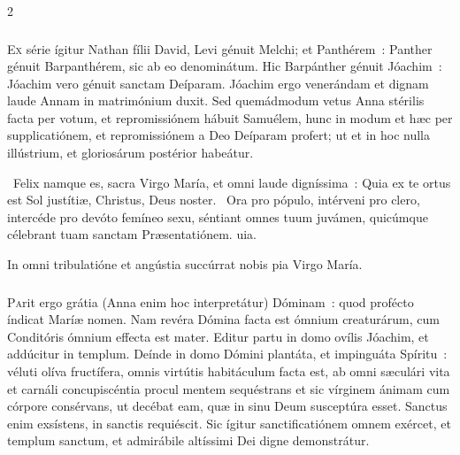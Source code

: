 \documentclass[9pt,twoside]{extarticle}
\begin{document}
\begin{multicols}{2}
\subsubsection*{\center{}}
\lettrine{E}x série ígitur Nathan fílii David, Levi génuit Melchi; et Panthérem~: Panther génuit Barpanthérem, sic ab eo denominátum. Hic Barpánther génuit Jóachim~: Jóachim vero génuit sanctam Deíparam. Jóachim ergo venerándam et dignam laude Annam in matrimónium duxit. Sed quemádmodum vetus Anna stérilis facta per votum, et repromissiónem hábuit Samuélem, hunc in modum et hæc per supplicatiónem, et repromissiónem a Deo Deíparam profert; ut et in hoc nulla illústrium, et gloriosárum postérior habeátur.

\begin{tightlist}{}
\item {}~Felix namque es, sacra Virgo María, et omni laude digníssima~: \textred{*} Quia ex te ortus est Sol justítiæ, Christus, Deus noster. ~Ora pro pópulo, intérveni pro clero, intercéde pro devóto femíneo sexu, séntiant omnes tuum juvámen, quicúmque célebrant tuam sanctam Præsentatiónem. uia.
\item {\small {} In omni tribulatióne et angústia succúrrat nobis pia Virgo María.}
\end{tightlist}

\subsubsection*{\center{}}
\lettrine{P}arit ergo grátia (Anna enim hoc interpretátur) Dóminam~: quod profécto índicat Maríæ nomen. Nam revéra Dómina facta est ómnium creaturárum, cum Conditóris ómnium effecta est mater. Editur partu in domo ovílis Jóachim, et addúcitur in templum. Deínde in domo Dómini plantáta, et impinguáta Spíritu~: véluti olíva fructífera, omnis virtútis habitáculum facta est, ab omni sæculári vita et carnáli concupiscéntia procul mentem sequéstrans et sic vírginem ánimam cum córpore consérvans, ut decébat eam, quæ in sinu Deum susceptúra esset. Sanctus enim exsístens, in sanctis requiéscit. Sic ígitur sanctificatiónem omnem exércet, et templum sanctum, et admirábile altíssimi Dei digne demonstrátur.


\end{multicols}
\end{document}
